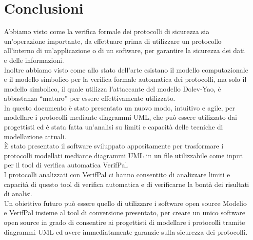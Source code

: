 \section{Conclusioni}
Abbiamo visto come la verifica formale dei protocolli di sicurezza sia un'operazione importante, da effettuare prima di utilizzare un protocollo all'interno di un'applicazione o di un software, per garantire la sicurezza dei dati e delle informazioni.\\
Inoltre abbiamo visto come allo stato dell'arte esistano il modello computazionale e il modello simbolico per la verifica formale automatica dei protocolli, ma solo il modello simbolico, il quale utilizza l'attaccante del modello Dolev-Yao, è abbastanza ``maturo'' per essere effettivamente utilizzato.\\ 
In questo documento è stato presentato un nuovo modo, intuitivo e agile, per modellare i protocolli mediante diagrammi UML, che può essere utilizzato dai progettisti ed è stata fatta un'analisi su limiti e capacità delle tecniche di modellazione attuali. \\
\`E stato presentato il software sviluppato appositamente per trasformare i protocolli modellati mediante diagrammi UML in un file utilizzabile come input per il tool di verifica automatica VerifPal.\\
I protocolli analizzati con VerifPal ci hanno consentito di analizzare limiti e capacità di questo tool di verifica automatica e di verificarne la bontà dei risultati di analisi.\\
Un obiettivo futuro può essere quello di utilizzare i software open source Modelio e VerifPal insieme al tool di conversione  presentato, per creare un unico software open source in grado di consentire ai progettisti di modellare i protocolli tramite diagrammi UML ed avere immediatamente garanzie sulla sicurezza dei protocolli.
